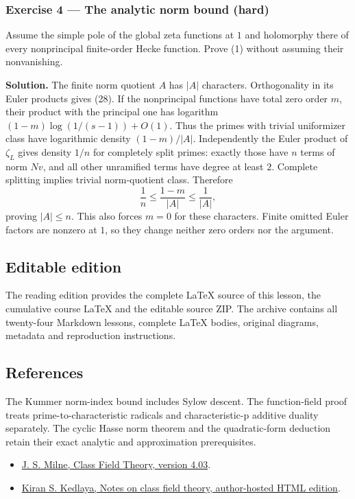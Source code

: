 \documentclass[11pt,a4paper]{article}
\newcommand{\tightlist}{\setlength{\itemsep}{0pt}\setlength{\parskip}{0pt}}
\begin{document}
\subsubsection{Exercise 4 --- The analytic norm bound
(hard)}\label{exercise-4-the-analytic-norm-bound-hard}

Assume the simple pole of the global zeta functions at \(1\) and
holomorphy there of every nonprincipal finite-order Hecke function.
Prove (1) without assuming their nonvanishing.

\textbf{Solution.} The finite norm quotient \(A\) has \(|A|\)
characters. Orthogonality in its Euler products gives (28). If the
nonprincipal functions have total zero order \(m\), their product with
the principal one has logarithm \((1-m)\log(1/(s-1))+O(1)\). Thus the
primes with trivial uniformizer class have logarithmic density
\((1-m)/|A|\). Independently the Euler product of \(\zeta_L\) gives
density \(1/n\) for completely split primes: exactly those have \(n\)
terms of norm \(Nv\), and all other unramified terms have degree at
least \(2\). Complete splitting implies trivial norm-quotient class.
Therefore \[
\frac1n\leq\frac{1-m}{|A|}\leq\frac1{|A|},
\] proving \(|A|\leq n\). This also forces \(m=0\) for these characters.
Finite omitted Euler factors are nonzero at \(1\), so they change
neither zero orders nor the argument.

\subsection{Editable edition}\label{editable-edition}

The reading edition provides the complete LaTeX source of this lesson,
the cumulative course LaTeX and the editable source ZIP. The archive
contains all twenty-four Markdown lessons, complete LaTeX bodies,
original diagrams, metadata and reproduction instructions.

\subsection{References}\label{references}

The Kummer norm-index bound includes Sylow descent. The function-field
proof treats prime-to-characteristic radicals and characteristic-p
additive duality separately. The cyclic Hasse norm theorem and the
quadratic-form deduction retain their exact analytic and approximation
prerequisites.

\begin{itemize}
\tightlist
\item
  \href{https://www.jmilne.org/math/CourseNotes/CFT.pdf}{J. S. Milne,
  Class Field Theory, version 4.03}.
\item
  \href{https://kskedlaya.org/cft/sec_abstractcft1.html}{Kiran S.
  Kedlaya, Notes on class field theory, author-hosted HTML edition}.
\end{itemize}
\end{document}
